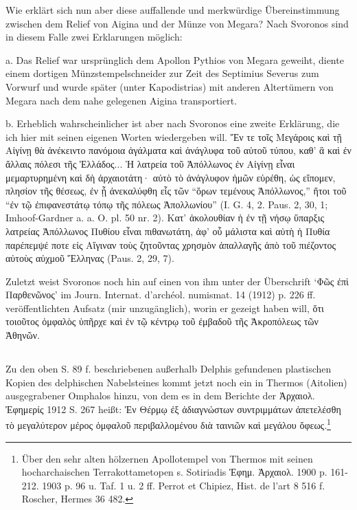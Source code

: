\documentclass[a4paper, 11pt, oneside]{article}
\begin{document}
Wie erklärt sich nun aber diese auffallende und merkwürdige Übereinstimmung zwischen dem Relief von Aigina und der Münze von Megara? Nach Svoronos sind in diesem Falle zwei Erklarungen möglich:

a. Das Relief war ursprünglich dem Apollon Pythios von Megara geweiht, diente einem dortigen Münzstempelschneider zur Zeit des Septimius Severus zum Vorwurf und wurde später (unter Kapodistrias) mit anderen Altertümern von Megara nach dem nahe gelegenen Aigina transportiert.

b. Erheblich wahrscheinlicher ist aber nach Svoronos eine zweite Erklärung, die ich hier mit seinen eigenen Worten wiedergeben will. Ἔν τε τοῖς Μεγάροις καὶ τῇ Αἰγίνῃ θὰ ἀνέκειντο πανόμοια ἀγάλματα καὶ ἀνάγλυφα τοῦ αὐτοῦ τύπου, καθ' ἃ καὶ ἐν ἄλλαις πόλεσι τῆς Ἑλλάδος... Ἡ λατρεία τοῦ Ἀπόλλωνος ἐν Αἰγίνῃ εἶναι μεμαρτυρημένη καὶ δὴ ἀρχαιοτάτη· αὐτὸ τὸ ἀνάγλυφον ἡμῶν εὑρέθη, ὡς εἴπομεν, πλησίον τῆς θέσεως, ἐν ᾗ ἀνεκαλύφθη εἷς τῶν "`ὅρων τεμένους Ἀπόλλωνος,"' ἤτοι τοῦ "`ἐν τῷ ἐπιφανεστάτῳ τόπῳ τῆς πόλεως Ἀπολλωνίου"' (I. G. 4, 2. Paus. 2, 30, 1; Imhoof-Gardner a. a. O. pl. 50 nr. 2). Κατ' ἀκολουθίαν ἡ ἐν τῇ νήσῳ ὕπαρξις λατρείας Ἀπόλλωνος Πυθίου εἶναι πιθανωτάτη, ἀφ' οὗ μάλιστα καὶ αὐτὴ ἡ Πυθία παρέπεμψέ ποτε εἰς Αἴγιναν τοὺς ζητοῦντας χρησμὸν ἀπαλλαγῆς ἀπὸ τοῦ πιέζοντος αὐτοὺς αὐχμοῦ Ἕλληνας (Paus. 2, 29, 7).

Zuletzt weist Svoronos noch hin auf einen von ihm unter der Überschrift `Φῶς ἐπὶ Παρθενῶνος' im Journ. Internat. d'archéol. numismat. 14 (1912) p. 226 ff. veröffentlichten Aufsatz (mir unzugänglich), worin er gezeigt haben will, ὅτι τοιοῦτος ὀμφαλὸς ὑπῆρχε καὶ ἐν τῷ κέντρῳ τοῦ ἐμβαδοῦ τῆς Ἀκροπόλεως τῶν Ἀθηνῶν.

\subsection{}
\paragraph{}
Zu den oben S. 89 f. beschriebenen außerhalb Delphis gefundenen plastischen Kopien des delphischen Nabelsteines kommt jetzt noch ein in Thermos (Aitolien) ausgegrabener Omphalos hinzu, von dem es in dem Berichte der Ἀρχαιολ. Ἐφημερίς 1912 S. 267 heißt: Ἐν Θέρμῳ ἐξ ἀδιαγνώστων συντριμμάτων ἀπετελέσθη τὸ μεγαλύτερον μέρος ὀμφαλοῦ περιβαλλομένου διὰ ταινιῶν καὶ μεγάλου ὄφεως.\footnote{Über den sehr alten hölzernen Apollotempel von Thermos mit seinen hocharchaischen Terrakottametopen s. Sotiriadis Ἐφημ. Ἀρχαιολ. 1900 p. 161-212. 1903 p. 96 u. Taf. 1 u. 2 ff. Perrot et Chipiez, Hist. de l'art 8 516 f. Roscher, Hermes 36 482.}
\end{document}
